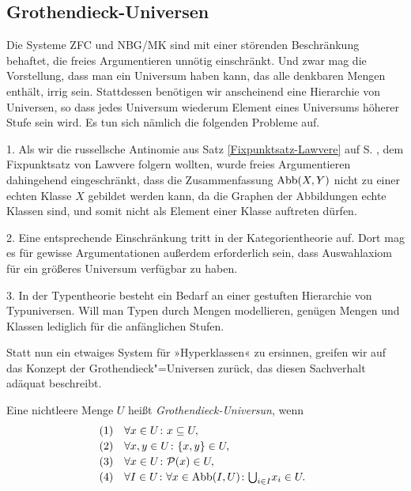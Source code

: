 \subsection{Grothendieck-Universen}

Die Systeme ZFC und NBG/MK sind mit einer störenden Beschränkung
behaftet, die freies Argumentieren unnötig einschränkt. Und zwar
mag die Vorstellung, dass man ein Universum haben kann,
das alle denkbaren Mengen enthält, irrig sein. Stattdessen benötigen wir
anscheinend eine Hierarchie von Universen, so dass jedes Universum
wiederum Element eines Universums höherer Stufe sein wird. Es tun sich
nämlich die folgenden Probleme auf.

1. Als wir die russellsche Antinomie aus Satz \ref{Fixpunktsatz-Lawvere}
auf S. \pageref{Fixpunktsatz-Lawvere}, dem Fixpunktsatz von Lawvere
 folgern wollten, wurde freies Argumentieren
dahingehend eingeschränkt, dass die Zusammenfassung $\operatorname{Abb}(X,Y)$ nicht zu
einer echten Klasse $X$ gebildet werden kann, da die Graphen der Abbildungen
echte Klassen sind, und somit nicht als Element einer Klasse auftreten dürfen.

2. Eine entsprechende Einschränkung tritt in der Kategorientheorie
auf. Dort mag es für gewisse Argumentationen außerdem erforderlich sein,
dass Auswahlaxiom für ein größeres Universum verfügbar zu haben.

3. In der Typentheorie besteht ein Bedarf an einer gestuften
Hierarchie von Typuniversen. Will man Typen durch Mengen modellieren,
genügen Mengen und Klassen lediglich für die anfänglichen Stufen.

Statt nun ein etwaiges System für »Hyperklassen« zu ersinnen, greifen wir
auf das Konzept der Grothendieck"=Universen zurück, das diesen
Sachverhalt adäquat beschreibt.

\begin{Definition}\newlinefirst
Eine nichtleere Menge $U$ heißt \emph{Grothendieck-Universun},%
 wenn
\[\begin{array}{@{}r@{\quad}l}
\text{(1)} & \forall x\in U\colon x\subseteq U,\\[2pt]
\text{(2)} & \forall x,y\in U\colon \{x,y\}\in U,\\[2pt]
\text{(3)} & \forall x\in U\colon\powerset(x)\in U,\\[2pt]
\text{(4)} & \forall I\in U\colon\forall x\in\operatorname{Abb}(I,U)\colon
  {\textstyle\bigcup_{i\in I}} x_i\in U.
\end{array}\]
\end{Definition}

